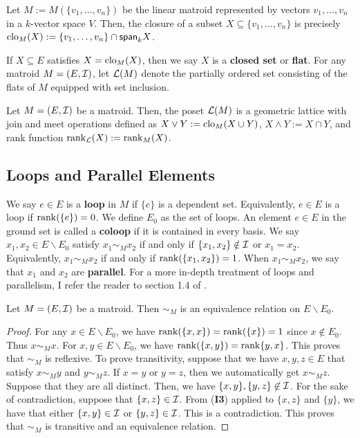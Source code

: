 \documentclass{puthesis-UG}
\begin{document}
\begin{example}
	Let $M := M(\{v_1, \ldots, v_n\})$ be the linear matroid represented by vectors $v_1, \ldots, v_n$ in a $k$-vector space $V$. Then, the closure of a subset $X \subseteq \{v_1, \ldots, v_n\}$ is precisely $\operatorname{clo}_M(X) := \{v_1, \ldots, v_n\} \cap \mathsf{span}_k X$. 
\end{example}

If $X \subseteq E$ satisfies $X = \operatorname{clo}_M(X)$, then we say $X$ is a \textbf{closed set} or \textbf{flat}. For any matroid $M = (E, \mathcal{I})$, let $\mathcal{L}(M)$ denote the partially ordered set consisting of the flats of $M$ equipped with set inclusion. 

\begin{prop}
	Let $M = (E, \mathcal{I})$ be a matroid. Then, the poset $\mathcal{L}(M)$ is a geometric lattice with join and meet operations defined as $X \vee Y := \operatorname{clo}_M(X \cup Y)$, $X \wedge Y := X \cap Y$, and rank function $\operatorname{rank}_{\mathcal{L}} (X) := \operatorname{rank}_M(X)$. 
\end{prop}


\subsection{Loops and Parallel Elements}
We say $e \in E$ is a \textbf{loop} in $M$ if $\{e\}$ is a dependent set. Equivalently, $e \in E$ is a loop if $\operatorname{rank} (\{e\}) = 0$. We define $E_0$ as the set of loops. An element $e \in E$ in the ground set is called a \textbf{coloop} if it is contained in every basis. We say $x_1, x_2 \in E \backslash E_0$ satisfy $x_1 \sim_M x_2$ if and only if $\{x_1, x_2\} \notin \mathcal{I}$ or $x_1 = x_2$. Equivalently, $x_1 \sim_M x_2$ if and only if $\operatorname{rank} (\{x_1, x_2\}) = 1$. When $x_1 \sim_M x_2$, we say that $x_1$ and $x_2$ are \textbf{parallel}. For a more in-depth treatment of loops and parallelism, I refer the reader to section 1.4 of \cite{welsh}.

\begin{prop} \label{parallelism-is-equivalence-relation}
	Let $M = (E, \mathcal{I})$ be a matroid. Then $\sim_M$ is an equivalence relation on $E \backslash E_0$. 
\end{prop}

\begin{proof}
	For any $x \in E \backslash E_0$, we have $\operatorname{rank} (\{x, x\}) = \operatorname{rank} (\{x\}) = 1$ since $x \notin E_0$. Thus $x \sim_M x$. For $x, y \in E \backslash E_0$, we have $\operatorname{rank} (\{x, y\}) = \operatorname{rank} \{y, x\}$. This proves that $\sim_M$ is reflexive. To prove transitivity, suppose that we have $x, y, z \in E$ that satisfy $x \sim_M y$ and $y \sim_M z$. If $x = y$ or $y = z$, then we automatically get $x \sim_M z$. Suppose that they are all distinct. Then, we have $\{x, y\}, \{y, z\} \not\in \mathcal{I}$. For the sake of contradiction, suppose that $\{x, z\} \in \mathcal{I}$. From (\textbf{I3}) applied to $\{x, z\}$ and $\{y\}$, we have that either $\{x, y\} \in \mathcal{I}$ or $\{y, z\} \in \mathcal{I}$. This is a contradiction. This proves that $\sim_M$ is transitive and an equivalence relation. 
\end{proof}
\end{document}
